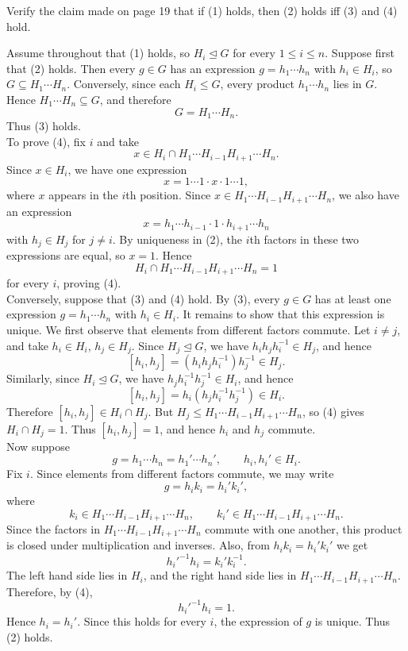 \documentclass[../Odyssey_Project.tex]{subfiles}
\begin{document}
\begin{exercise}
\label{ex:2.6}
Verify the claim made on page 19 that if (1) holds, then (2) holds iff (3) and (4) hold.
\end{exercise}
\begin{solution}
    Assume throughout that (1) holds, so $H_i \trianglelefteq G$ for every $1 \leq i \leq n$. Suppose first that (2) holds. Then every $g \in G$ has an expression $g = h_1\cdots h_n$ with $h_i \in H_i$, so $G \subseteq H_1\cdots H_n$. Conversely, since each $H_i \leq G$, every product $h_1\cdots h_n$ lies in $G$. Hence $H_1\cdots H_n \subseteq G$, and therefore
    \[
        G = H_1\cdots H_n.
    \]
    Thus (3) holds. \\
    To prove (4), fix $i$ and take
    \[
        x \in H_i \cap H_1\cdots H_{i-1}H_{i+1}\cdots H_n.
    \]
    Since $x \in H_i$, we have one expression
    \[
        x = 1\cdots 1 \cdot x \cdot 1\cdots 1,
    \]
    where $x$ appears in the $i$th position. Since $x \in H_1\cdots H_{i-1}H_{i+1}\cdots H_n$, we also have an expression
    \[
        x = h_1\cdots h_{i-1}\cdot 1 \cdot h_{i+1}\cdots h_n
    \]
    with $h_j \in H_j$ for $j \neq i$. By uniqueness in (2), the $i$th factors in these two expressions are equal, so $x = 1$. Hence
    \[
        H_i \cap H_1\cdots H_{i-1}H_{i+1}\cdots H_n = 1
    \]
    for every $i$, proving (4). \\
    Conversely, suppose that (3) and (4) hold. By (3), every $g \in G$ has at least one expression $g = h_1\cdots h_n$ with $h_i \in H_i$. It remains to show that this expression is unique. We first observe that elements from different factors commute. Let $i \neq j$, and take $h_i \in H_i$, $h_j \in H_j$. Since $H_j \trianglelefteq G$, we have $h_i h_j h_i^{-1} \in H_j$, and hence
    \[
        [h_i,h_j] = (h_i h_j h_i^{-1})h_j^{-1} \in H_j.
    \]
    Similarly, since $H_i \trianglelefteq G$, we have $h_j h_i^{-1}h_j^{-1} \in H_i$, and hence
    \[
        [h_i,h_j] = h_i(h_j h_i^{-1}h_j^{-1}) \in H_i.
    \]
    Therefore $[h_i,h_j] \in H_i \cap H_j$. But $H_j \leq H_1\cdots H_{i-1}H_{i+1}\cdots H_n$, so (4) gives $H_i \cap H_j = 1$. Thus $[h_i,h_j] = 1$, and hence $h_i$ and $h_j$ commute. \\
    Now suppose
    \[
        g = h_1\cdots h_n = h_1'\cdots h_n',
        \qquad
        h_i,h_i' \in H_i.
    \]
    Fix $i$. Since elements from different factors commute, we may write
    \[
        g = h_i k_i = h_i' k_i',
    \]
    where
    \[
        k_i \in H_1\cdots H_{i-1}H_{i+1}\cdots H_n,
        \qquad
        k_i' \in H_1\cdots H_{i-1}H_{i+1}\cdots H_n.
    \]
    Since the factors in $H_1\cdots H_{i-1}H_{i+1}\cdots H_n$ commute with one another, this product is closed under multiplication and inverses. Also, from $h_i k_i = h_i' k_i'$ we get
    \[
        h_i'^{-1}h_i = k_i'k_i^{-1}.
    \]
    The left hand side lies in $H_i$, and the right hand side lies in $H_1\cdots H_{i-1}H_{i+1}\cdots H_n$. Therefore, by (4),
    \[
        h_i'^{-1}h_i = 1.
    \]
    Hence $h_i = h_i'$. Since this holds for every $i$, the expression of $g$ is unique. Thus (2) holds.
\end{solution}
\end{document}
